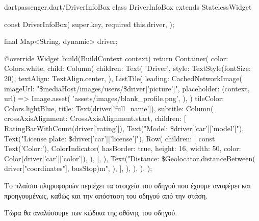 \documentclass[../thesis.tex]{subfiles}
\begin{document}
\begin{codeblock}{dart}{passenger.dart/DriverInfoBox}
  class DriverInfoBox extends StatelessWidget {
    const DriverInfoBox({
      super.key,
      required this.driver,
    });

    final Map<String, dynamic> driver;

    @override
    Widget build(BuildContext context) {
      return Container(
        color: Colors.white,
        child: Column(
          children: Text(
            'Driver',
            style: TextStyle(fontSize: 20),
            textAlign: TextAlign.center,
          ),
          ListTile(
            leading: CachedNetworkImage(
              imageUrl: "\$mediaHost/images/users/\${driver['picture']}",
              placeholder: (context, url) => Image.asset(
                'assets/images/blank_profile.png',
              ),
            )
            tileColor: Colors.lightBlue,
            title: Text(driver['full_name']),
            subtitle: Column(
              crossAxisAlignment: CrossAxisAlignment.start,
              children: [
                RatingBarWithCount(driver['rating']),
                Text("Model: \${driver['car']['model']}"),
                Text("License plate: \${driver['car']['license']}"),
                Row(
                  children: [
                    const Text('Color:'),
                    ColorIndicator(
                      hasBorder: true,
                      height: 16,
                      width: 50,
                      color: Color(driver['car']['color']),
                    ),
                  ],
                ),
                Text("Distance: \${Geolocator.distanceBetween(
                      driver["coordinates"],
                      busStop)}m",
                ),
              ],
            ),
          ),
        ),
      );
    }
  }
\end{codeblock}

Το πλαίσιο πληροφοριών περιέχει τα στοιχεία του οδηγού που έχουμε αναφέρει και προηγουμένως, καθώς και την απόσταση του οδηγού από την στάση.

Τώρα θα αναλύσουμε των κώδικα της οθόνης του οδηγού.
\end{document}
